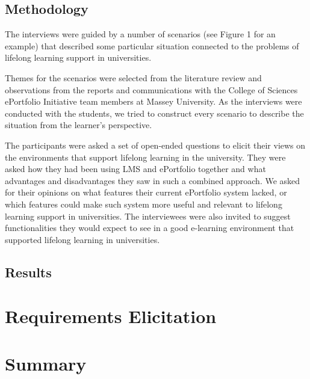 \subsection{Methodology}

The interviews were guided by a number of scenarios (see Figure 1 for an
example) that described some particular situation connected to the problems of
lifelong learning support in universities.

Themes for the scenarios were selected from the literature review and
observations from the reports and communications with the College of Sciences
ePortfolio Initiative team members at Massey University. As the interviews were
conducted with the students, we tried to construct every scenario to describe
the situation from the learner’s perspective.

The participants were asked a set of open-ended questions to elicit their views
on the environments that support lifelong learning in the university. They were
asked how they had been using LMS and ePortfolio together and what advantages
and disadvantages they saw in such a combined approach. We asked for their
opinions on what features their current ePortfolio system lacked, or which
features could make such system more useful and relevant to lifelong learning
support in universities. The interviewees were also invited to suggest
functionalities they would expect to see in a good e-learning environment that
supported lifelong learning in universities.

\subsection{Results}

\section{Requirements Elicitation}

\section{Summary}